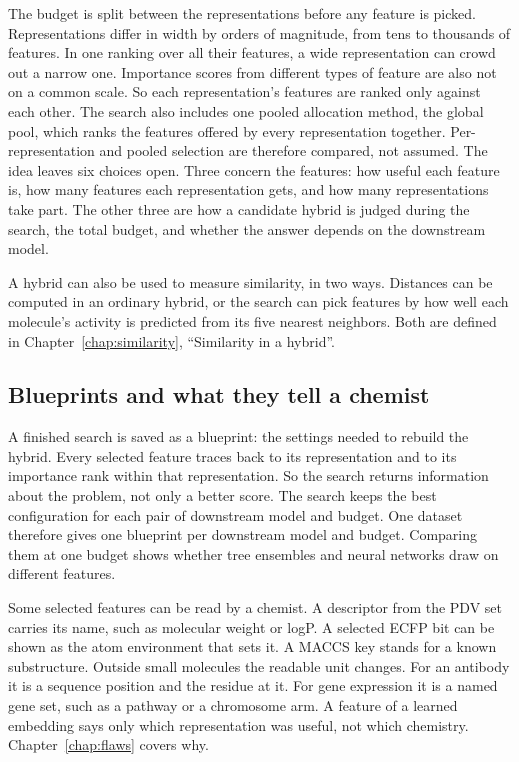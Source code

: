 The budget is split between the representations before any feature is picked. Representations differ in width by orders of magnitude, from tens to thousands of features. In one ranking over all their features, a wide representation can crowd out a narrow one. Importance scores from different types of feature are also not on a common scale. So each representation's features are ranked only against each other. The search also includes one pooled allocation method, the global pool, which ranks the features offered by every representation together. Per-representation and pooled selection are therefore compared, not assumed. The idea leaves six choices open. Three concern the features: how useful each feature is, how many features each representation gets, and how many representations take part. The other three are how a candidate hybrid is judged during the search, the total budget, and whether the answer depends on the downstream model.

A hybrid can also be used to measure similarity, in two ways. Distances can be computed in an ordinary hybrid, or the search can pick features by how well each molecule's activity is predicted from its five nearest neighbors. Both are defined in Chapter~\ref{chap:similarity}, ``Similarity in a hybrid''.


\subsection{Blueprints and what they tell a chemist}

A finished search is saved as a blueprint: the settings needed to rebuild the hybrid. Every selected feature traces back to its representation and to its importance rank within that representation. So the search returns information about the problem, not only a better score. The search keeps the best configuration for each pair of downstream model and budget. One dataset therefore gives one blueprint per downstream model and budget. Comparing them at one budget shows whether tree ensembles and neural networks draw on different features.

Some selected features can be read by a chemist. A descriptor from the PDV set carries its name, such as molecular weight or logP. A selected ECFP bit can be shown as the atom environment that sets it. A MACCS key stands for a known substructure. Outside small molecules the readable unit changes. For an antibody it is a sequence position and the residue at it. For gene expression it is a named gene set, such as a pathway or a chromosome arm. A feature of a learned embedding says only which representation was useful, not which chemistry. Chapter~\ref{chap:flaws} covers why.

